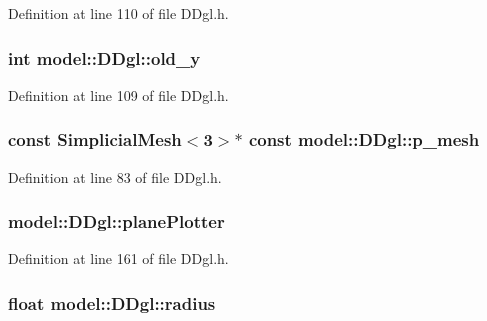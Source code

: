 Definition at line 110 of file D\+Dgl.\+h.

\hypertarget{structmodel_1_1_d_dgl_a45503561f1299f9588201ee29e285810}{}
\subsubsection[{old\+\_\+y}]{\setlength{\rightskip}{0pt plus 5cm}int model\+::\+D\+Dgl\+::old\+\_\+y}\label{structmodel_1_1_d_dgl_a45503561f1299f9588201ee29e285810}


Definition at line 109 of file D\+Dgl.\+h.

\hypertarget{structmodel_1_1_d_dgl_ae9bc30c2c3aa6dee243d01b8da9241b6}{}
\subsubsection[{p\+\_\+mesh}]{\setlength{\rightskip}{0pt plus 5cm}const {\bf Simplicial\+Mesh}$<$3$>$$\ast$ const model\+::\+D\+Dgl\+::p\+\_\+mesh}\label{structmodel_1_1_d_dgl_ae9bc30c2c3aa6dee243d01b8da9241b6}


Definition at line 83 of file D\+Dgl.\+h.

\hypertarget{structmodel_1_1_d_dgl_acd5dc0cb55ae2a3b2670a3186157617c}{}
\subsubsection[{plane\+Plotter}]{ model\+::\+D\+Dgl\+::plane\+Plotter}\label{structmodel_1_1_d_dgl_acd5dc0cb55ae2a3b2670a3186157617c}


Definition at line 161 of file D\+Dgl.\+h.

\hypertarget{structmodel_1_1_d_dgl_a844fb9dcdab7857454bbc8eb6949e101}{}
\subsubsection[{radius}]{\setlength{\rightskip}{0pt plus 5cm}float model\+::\+D\+Dgl\+::radius}\label{structmodel_1_1_d_dgl_a844fb9dcdab7857454bbc8eb6949e101}


